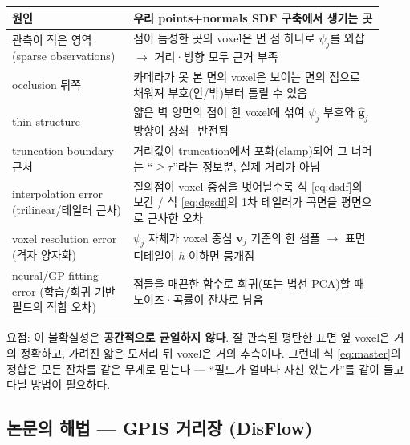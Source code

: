 \begin{longtable}{p{0.30\linewidth}p{0.62\linewidth}}
\toprule
\textbf{원인} & \textbf{우리 points+normals SDF 구축에서 생기는 곳} \\
\midrule
관측이 적은 영역 (sparse observations) & 점이 듬성한 곳의 voxel은 먼
  점 하나로 $\psi_j$를 외삽 $\to$ 거리·방향 모두 근거 부족 \\
occlusion 뒤쪽 & 카메라가 못 본 면의 voxel은 보이는 면의 점으로 채워져
  부호(안/밖)부터 틀릴 수 있음 \\
thin structure & 얇은 벽 양면의 점이 한 voxel에 섞여 $\psi_j$ 부호와
  $\hat{\mathbf{g}}_j$ 방향이 상쇄·반전됨 \\
truncation boundary 근처 & 거리값이 truncation에서 포화(clamp)되어 그
  너머는 ``$\ge\tau$''라는 정보뿐, 실제 거리가 아님 \\
interpolation error (trilinear/테일러 근사) & 질의점이 voxel 중심을
  벗어날수록 식 \eqref{eq:dsdf}의 보간 / 식 \eqref{eq:dgsdf}의 1차
  테일러가 곡면을 평면으로 근사한 오차 \\
voxel resolution error (격자 양자화) & $\psi_j$ 자체가 voxel 중심
  $\mathbf{v}_j$ 기준의 한 샘플 $\to$ 표면 디테일이 $h$ 이하면 뭉개짐 \\
neural/GP fitting error (학습/회귀 기반 필드의 적합 오차) & 점들을
  매끈한 함수로 회귀(또는 법선 PCA)할 때 노이즈·곡률이 잔차로 남음 \\
\bottomrule
\end{longtable}

요점: 이 불확실성은 \textbf{공간적으로 균일하지 않다}. 잘 관측된 평탄한
표면 옆 voxel은 거의 정확하고, 가려진 얇은 모서리 뒤 voxel은 거의
추측이다. 그런데 식 \eqref{eq:master}의 정합은 모든 잔차를 같은 무게로
믿는다 --- ``필드가 얼마나 자신 있는가''를 같이 들고 다닐 방법이 필요하다.

\subsection{논문의 해법 --- GPIS 거리장 (DisFlow)}
\label{sec:uncertainty-disflow}

